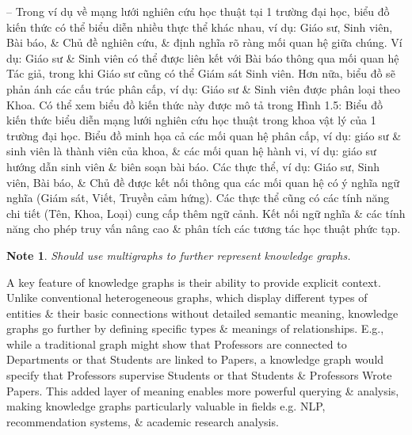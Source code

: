 \documentclass{article}
\newtheorem{note}{Note}
\begin{document}
\begin{itemize}
\begin{itemize}
\begin{itemize}
\begin{itemize}
                -- Trong ví dụ về mạng lưới nghiên cứu học thuật tại 1 trường đại học, biểu đồ kiến thức có thể biểu diễn nhiều thực thể khác nhau, ví dụ: Giáo sư, Sinh viên, Bài báo, \& Chủ đề nghiên cứu, \& định nghĩa rõ ràng mối quan hệ giữa chúng. Ví dụ: Giáo sư \& Sinh viên có thể được liên kết với Bài báo thông qua mối quan hệ Tác giả, trong khi Giáo sư cũng có thể Giám sát Sinh viên. Hơn nữa, biểu đồ sẽ phản ánh các cấu trúc phân cấp, ví dụ: Giáo sư \& Sinh viên được phân loại theo Khoa. Có thể xem biểu đồ kiến thức này được mô tả trong {\sf Hình 1.5: Biểu đồ kiến thức biểu diễn mạng lưới nghiên cứu học thuật trong khoa vật lý của 1 trường đại học. Biểu đồ minh họa cả các mối quan hệ phân cấp, ví dụ: giáo sư \& sinh viên là thành viên của khoa, \& các mối quan hệ hành vi, ví dụ: giáo sư hướng dẫn sinh viên \& biên soạn bài báo. Các thực thể, ví dụ: Giáo sư, Sinh viên, Bài báo, \& Chủ đề được kết nối thông qua các mối quan hệ có ý nghĩa ngữ nghĩa (Giám sát, Viết, Truyền cảm hứng). Các thực thể cũng có các tính năng chi tiết (Tên, Khoa, Loại) cung cấp thêm ngữ cảnh. Kết nối ngữ nghĩa \& các tính năng cho phép truy vấn nâng cao \& phân tích các tương tác học thuật phức tạp.}
                \begin{note}
                    Should use multigraphs to further represent knowledge graphs.
                \end{note}
                A key feature of knowledge graphs is their ability to provide explicit context. Unlike conventional heterogeneous graphs, which display different types of entities \& their basic connections without detailed semantic meaning, knowledge graphs go further by defining specific types \& meanings of relationships. E.g., while a traditional graph might show that Professors are connected to Departments or that Students are linked to Papers, a knowledge graph would specify that Professors supervise Students or that Students \& Professors Wrote Papers. This added layer of meaning enables more powerful querying \& analysis, making knowledge graphs particularly valuable in fields e.g. NLP, recommendation systems, \& academic research analysis.


\end{itemize}
\end{itemize}
\end{itemize}
\end{itemize}
\end{document}
